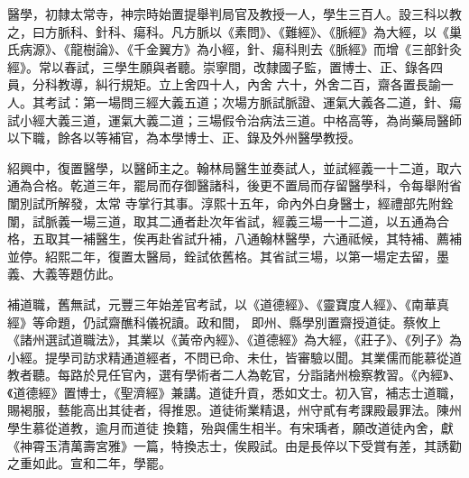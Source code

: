 \begin{pinyinscope}
 醫學，初隸太常寺，神宗時始置提舉判局官及教授一人，學生三百人。設三科以教之，曰方脈科、針科、瘍科。凡方脈以《素問》、《難經》、《脈經》為大經，以《巢氏病源》、《龍樹論》、《千金翼方》為小經，針、瘍科則去《脈經》而增《三部針灸經》。常以春試，三學生願與者聽。崇寧間，改隸國子監，置博士、正、錄各四員，分科教導，糾行規矩。立上舍四十人，內舍
 六十，外舍二百，齋各置長諭一人。其考試：第一場問三經大義五道；次場方脈試脈證、運氣大義各二道，針、瘍試小經大義三道，運氣大義二道；三場假令治病法三道。中格高等，為尚藥局醫師以下職，餘各以等補官，為本學博士、正、錄及外州醫學教授。



 紹興中，復置醫學，以醫師主之。翰林局醫生並奏試人，並試經義一十二道，取六通為合格。乾道三年，罷局而存御醫諸科，後更不置局而存留醫學科，令每舉附省闈別試所解發，太常
 寺掌行其事。淳熙十五年，命內外白身醫士，經禮部先附銓闈，試脈義一場三道，取其二通者赴次年省試，經義三場一十二道，以五通為合格，五取其一補醫生，俟再赴省試升補，八通翰林醫學，六通祗候，其特補、薦補並停。紹熙二年，復置太醫局，銓試依舊格。其省試三場，以第一場定去留，墨義、大義等題仿此。



 補道職，舊無試，元豐三年始差官考試，以《道德經》、《靈寶度人經》、《南華真經》等命題，仍試齋醮科儀祝讀。政和間，
 即州、縣學別置齋授道徒。蔡攸上《諸州選試道職法》，其業以《黃帝內經》、《道德經》為大經，《莊子》、《列子》為小經。提學司訪求精通道經者，不問已命、未仕，皆審驗以聞。其業儒而能慕從道教者聽。每路於見任官內，選有學術者二人為乾官，分詣諸州檢察教習。《內經》、《道德經》置博士，《聖濟經》兼講。道徒升貢，悉如文士。初入官，補志士道職，賜褐服，藝能高出其徒者，得推恩。道徒術業精退，州守貳有考課殿最罪法。陳州學生慕從道教，逾月而道徒
 換籍，殆與儒生相半。有宋瑀者，願改道徒內舍，獻《神霄玉清萬壽宮雅》一篇，特換志士，俟殿試。由是長倅以下受賞有差，其誘勸之重如此。宣和二年，學罷。



\end{pinyinscope}